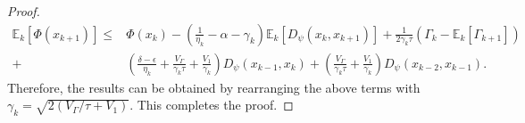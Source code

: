 \documentclass[letterpaper]{article} %
\begin{document}
\begin{proof}
		\[
		\begin{aligned}
			\mathbb{E}_{k}[\Phi(x_{k+1})]\le& \Phi(x_{k}) -\left(\frac{1}{\eta_{k}}-\alpha-\gamma_{k}\right)\mathbb{E}_{k}[D_{\psi}(x_{k},x_{k+1})]+\frac{1}{2\gamma_{k}\tau}(\Gamma_{k}-\mathbb{E}_{k}[\Gamma_{k+1}])\\
			+&\left(\frac{\delta-\epsilon}{\eta_{k}}+\frac{V_{\Gamma}}{\gamma_{k}\tau}+\frac{V_{1}}{\gamma_{k}}\right)D_{\psi}(x_{k-1},x_{k})+\left(\frac{V_{\Gamma}}{\gamma_{k}\tau}+\frac{V_{1}}{\gamma_{k}}\right)D_{\psi}(x_{k-2},x_{k-1}).
		\end{aligned}
		\]
		Therefore, the results can be obtained by  rearranging the above terms  with $\gamma_{k}=\sqrt{2(V_{\Gamma}/\tau+V_{1})}$. 
		This completes the proof.
	\end{proof}
	
\end{document}
